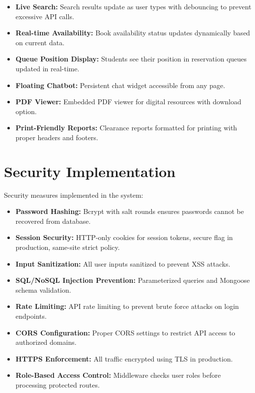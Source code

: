\documentclass[12pt,a4paper]{report}
\begin{document}
\begin{itemize}
    \item \textbf{Live Search:} Search results update as user types with debouncing to prevent excessive API calls.
    
    \item \textbf{Real-time Availability:} Book availability status updates dynamically based on current data.
    
    \item \textbf{Queue Position Display:} Students see their position in reservation queues updated in real-time.
    
    \item \textbf{Floating Chatbot:} Persistent chat widget accessible from any page.
    
    \item \textbf{PDF Viewer:} Embedded PDF viewer for digital resources with download option.
    
    \item \textbf{Print-Friendly Reports:} Clearance reports formatted for printing with proper headers and footers.
\end{itemize}

\section{Security Implementation}
\label{sec:securityimpl}

Security measures implemented in the system:

\begin{itemize}
    \item \textbf{Password Hashing:} Bcrypt with salt rounds ensures passwords cannot be recovered from database.
    
    \item \textbf{Session Security:} HTTP-only cookies for session tokens, secure flag in production, same-site strict policy.
    
    \item \textbf{Input Sanitization:} All user inputs sanitized to prevent XSS attacks.
    
    \item \textbf{SQL/NoSQL Injection Prevention:} Parameterized queries and Mongoose schema validation.
    
    \item \textbf{Rate Limiting:} API rate limiting to prevent brute force attacks on login endpoints.
    
    \item \textbf{CORS Configuration:} Proper CORS settings to restrict API access to authorized domains.
    
    \item \textbf{HTTPS Enforcement:} All traffic encrypted using TLS in production.
    
    \item \textbf{Role-Based Access Control:} Middleware checks user roles before processing protected routes.
\end{itemize}
\end{document}
